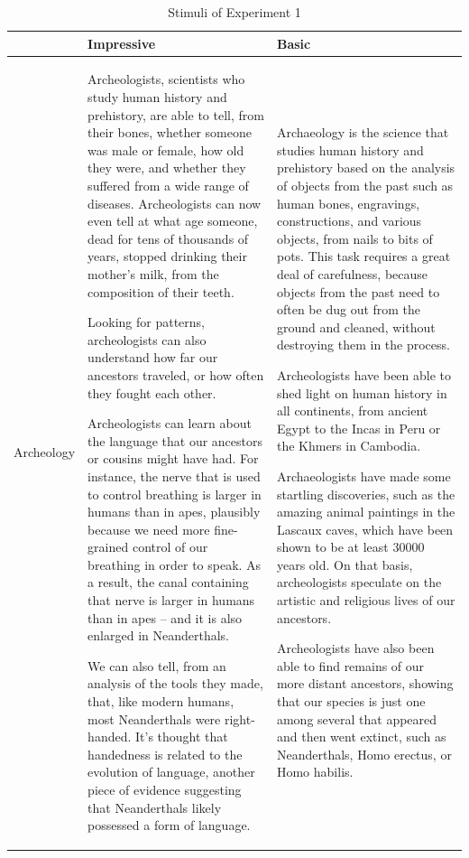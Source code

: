 \documentclass[
  doc,floatsintext]{apa6}
\begin{document}
\begin{longtable}[t]{>{\raggedright\arraybackslash}p{5em}>{\raggedright\arraybackslash}p{20em}>{\raggedright\arraybackslash}p{20em}}
\caption{\label{tab:exp1-stimuli}Stimuli of Experiment 1}\\
\toprule
 & Impressive & Basic\\
\midrule
Archeology & Archeologists, scientists who study human history and prehistory, are able to tell, from their bones, whether someone was male or female, how old they were, and whether they suffered from a wide range of diseases. Archeologists can now even tell at what age someone, dead for tens of thousands of years, stopped drinking their mother’s milk, from the composition of their teeth. 

Looking for patterns, archeologists can also understand how far our ancestors traveled, or how often they fought each other.

Archeologists can learn about the language that our ancestors or cousins might have had. For instance, the nerve that is used to control breathing is larger in humans than in apes, plausibly because we need more fine-grained control of our breathing in order to speak. As a result, the canal containing that nerve is larger in humans than in apes – and it is also enlarged in Neanderthals. 

We can also tell, from an analysis of the tools they made, that, like modern humans, most Neanderthals were right-handed. It’s thought that handedness is related to the evolution of language, another piece of evidence suggesting that Neanderthals likely possessed a form of language. & Archaeology is the science that studies human history and prehistory based on the analysis of objects from the past such as human bones, engravings, constructions, and various objects, from nails to bits of pots. This task requires a great deal of carefulness, because objects from the past need to often be dug out from the ground and cleaned, without destroying them in the process. 

Archeologists have been able to shed light on human history in all continents, from ancient Egypt to the Incas in Peru or the Khmers in Cambodia. 

Archaeologists have made some startling discoveries, such as the amazing animal paintings in the Lascaux caves, which have been shown to be at least 30000 years old. On that basis, archeologists speculate on the artistic and religious lives of our ancestors. 

Archeologists have also been able to find remains of our more distant ancestors, showing that our species is just one among several that appeared and then went extinct, such as Neanderthals, Homo erectus, or Homo habilis. 


\end{longtable}
\end{document}
